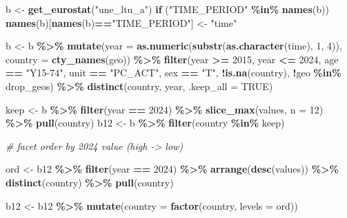 \documentclass[
]{article}
\newenvironment{Shaded}{\begin{snugshade}}{\end{snugshade}}
\newcommand{\AttributeTok}[1]{\textcolor[rgb]{0.13,0.29,0.53}{#1}}
\newcommand{\CommentTok}[1]{\textcolor[rgb]{0.56,0.35,0.01}{\textit{#1}}}
\newcommand{\ConstantTok}[1]{\textcolor[rgb]{0.56,0.35,0.01}{#1}}
\newcommand{\ControlFlowTok}[1]{\textcolor[rgb]{0.13,0.29,0.53}{\textbf{#1}}}
\newcommand{\DecValTok}[1]{\textcolor[rgb]{0.00,0.00,0.81}{#1}}
\newcommand{\FunctionTok}[1]{\textcolor[rgb]{0.13,0.29,0.53}{\textbf{#1}}}
\newcommand{\NormalTok}[1]{#1}
\newcommand{\OtherTok}[1]{\textcolor[rgb]{0.56,0.35,0.01}{#1}}
\newcommand{\SpecialCharTok}[1]{\textcolor[rgb]{0.81,0.36,0.00}{\textbf{#1}}}
\newcommand{\StringTok}[1]{\textcolor[rgb]{0.31,0.60,0.02}{#1}}
\begin{document}
\begin{Shaded}
\begin{Highlighting}[]
\NormalTok{b }\OtherTok{\textless{}{-}} \FunctionTok{get\_eurostat}\NormalTok{(}\StringTok{"une\_ltu\_a"}\NormalTok{)}
\ControlFlowTok{if}\NormalTok{ (}\StringTok{"TIME\_PERIOD"} \SpecialCharTok{\%in\%} \FunctionTok{names}\NormalTok{(b)) }\FunctionTok{names}\NormalTok{(b)[}\FunctionTok{names}\NormalTok{(b)}\SpecialCharTok{==}\StringTok{"TIME\_PERIOD"}\NormalTok{] }\OtherTok{\textless{}{-}} \StringTok{"time"}

\NormalTok{b }\OtherTok{\textless{}{-}}\NormalTok{ b }\SpecialCharTok{\%\textgreater{}\%}
\FunctionTok{mutate}\NormalTok{(}\AttributeTok{year =} \FunctionTok{as.numeric}\NormalTok{(}\FunctionTok{substr}\NormalTok{(}\FunctionTok{as.character}\NormalTok{(time), }\DecValTok{1}\NormalTok{, }\DecValTok{4}\NormalTok{)),}
\AttributeTok{country =} \FunctionTok{cty\_names}\NormalTok{(geo)) }\SpecialCharTok{\%\textgreater{}\%}
\FunctionTok{filter}\NormalTok{(year }\SpecialCharTok{\textgreater{}=} \DecValTok{2015}\NormalTok{, year }\SpecialCharTok{\textless{}=} \DecValTok{2024}\NormalTok{,}
\NormalTok{age }\SpecialCharTok{==} \StringTok{"Y15{-}74"}\NormalTok{, unit }\SpecialCharTok{==} \StringTok{"PC\_ACT"}\NormalTok{, sex }\SpecialCharTok{==} \StringTok{"T"}\NormalTok{,}
\SpecialCharTok{!}\FunctionTok{is.na}\NormalTok{(country), }\SpecialCharTok{!}\NormalTok{geo }\SpecialCharTok{\%in\%}\NormalTok{ drop\_geos) }\SpecialCharTok{\%\textgreater{}\%}
\FunctionTok{distinct}\NormalTok{(country, year, }\AttributeTok{.keep\_all =} \ConstantTok{TRUE}\NormalTok{)}

\NormalTok{keep }\OtherTok{\textless{}{-}}\NormalTok{ b }\SpecialCharTok{\%\textgreater{}\%} \FunctionTok{filter}\NormalTok{(year }\SpecialCharTok{==} \DecValTok{2024}\NormalTok{) }\SpecialCharTok{\%\textgreater{}\%} \FunctionTok{slice\_max}\NormalTok{(values, }\AttributeTok{n =} \DecValTok{12}\NormalTok{) }\SpecialCharTok{\%\textgreater{}\%} \FunctionTok{pull}\NormalTok{(country)}
\NormalTok{b12 }\OtherTok{\textless{}{-}}\NormalTok{ b }\SpecialCharTok{\%\textgreater{}\%} \FunctionTok{filter}\NormalTok{(country }\SpecialCharTok{\%in\%}\NormalTok{ keep)}

\CommentTok{\# facet order by 2024 value (high {-}\textgreater{} low)}

\NormalTok{ord }\OtherTok{\textless{}{-}}\NormalTok{ b12 }\SpecialCharTok{\%\textgreater{}\%}
\FunctionTok{filter}\NormalTok{(year }\SpecialCharTok{==} \DecValTok{2024}\NormalTok{) }\SpecialCharTok{\%\textgreater{}\%}
\FunctionTok{arrange}\NormalTok{(}\FunctionTok{desc}\NormalTok{(values)) }\SpecialCharTok{\%\textgreater{}\%}
\FunctionTok{distinct}\NormalTok{(country) }\SpecialCharTok{\%\textgreater{}\%}
\FunctionTok{pull}\NormalTok{(country)}

\NormalTok{b12 }\OtherTok{\textless{}{-}}\NormalTok{ b12 }\SpecialCharTok{\%\textgreater{}\%} \FunctionTok{mutate}\NormalTok{(}\AttributeTok{country =} \FunctionTok{factor}\NormalTok{(country, }\AttributeTok{levels =}\NormalTok{ ord))}
\end{Highlighting}
\end{Shaded}
\end{document}
